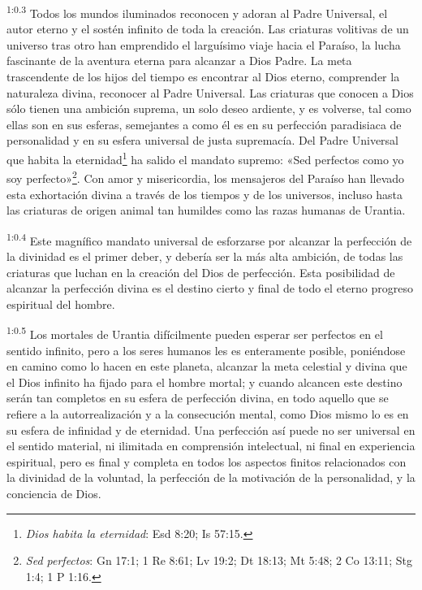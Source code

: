 \par
\textsuperscript{1:0.3} Todos los mundos iluminados reconocen y adoran al Padre Universal, el autor eterno y el sostén infinito de toda la creación. Las criaturas volitivas de un universo tras otro han emprendido el larguísimo viaje hacia el Paraíso, la lucha fascinante de la aventura eterna para alcanzar a Dios Padre. La meta trascendente de los hijos del tiempo es encontrar al Dios eterno, comprender la naturaleza divina, reconocer al Padre Universal. Las criaturas que conocen a Dios sólo tienen una ambición suprema, un solo deseo ardiente, y es volverse, tal como ellas son en sus esferas, semejantes a como él es en su perfección paradisiaca de personalidad y en su esfera universal de justa supremacía. Del Padre Universal que habita la eternidad\footnote{\textit{Dios habita la eternidad}: Esd 8:20; Is 57:15.} ha salido el mandato supremo: «Sed perfectos como yo soy perfecto»\footnote{\textit{Sed perfectos}: Gn 17:1; 1 Re 8:61; Lv 19:2; Dt 18:13; Mt 5:48; 2 Co 13:11; Stg 1:4; 1 P 1:16.}. Con amor y misericordia, los mensajeros del Paraíso han llevado esta exhortación divina a través de los tiempos y de los universos, incluso hasta las criaturas de origen animal tan humildes como las razas humanas de Urantia.

\par
\textsuperscript{1:0.4} Este magnífico mandato universal de esforzarse por alcanzar la perfección de la divinidad es el primer deber, y debería ser la más alta ambición, de todas las criaturas que luchan en la creación del Dios de perfección. Esta posibilidad de alcanzar la perfección divina es el destino cierto y final de todo el eterno progreso espiritual del hombre.

\par
\textsuperscript{1:0.5} Los mortales de Urantia difícilmente pueden esperar ser perfectos en el sentido infinito, pero a los seres humanos les es enteramente posible, poniéndose en camino como lo hacen en este planeta, alcanzar la meta celestial y divina que el Dios infinito ha fijado para el hombre mortal; y cuando alcancen este destino serán tan completos en su esfera de perfección divina, en todo aquello que se refiere a la autorrealización y a la consecución mental, como Dios mismo lo es en su esfera de infinidad y de eternidad. Una perfección así puede no ser universal en el sentido material, ni ilimitada en comprensión intelectual, ni final en experiencia espiritual, pero es final y completa en todos los aspectos finitos relacionados con la divinidad de la voluntad, la perfección de la motivación de la personalidad, y la conciencia de Dios.

